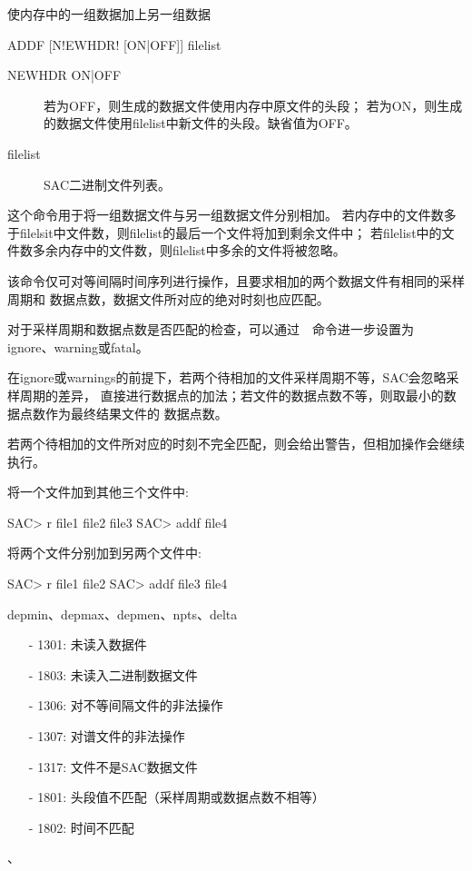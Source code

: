 \label{cmd:addf}

使内存中的一组数据加上另一组数据

\begin{SACSTX}
ADDF [N!EWHDR! [ON|OFF]] filelist
\end{SACSTX}

\begin{description}
\item [NEWHDR ON|OFF] 若为OFF，则生成的数据文件使用内存中原文件的头段；
    若为ON，则生成的数据文件使用filelist中新文件的头段。缺省值为OFF。
\item [filelist] SAC二进制文件列表。
\end{description}

这个命令用于将一组数据文件与另一组数据文件分别相加。
若内存中的文件数多于filelsit中文件数，则filelist的最后一个文件将加到剩余文件中；
若filelist中的文件数多余内存中的文件数，则filelist中多余的文件将被忽略。

该命令仅可对等间隔时间序列进行操作，且要求相加的两个数据文件有相同的采样周期和
数据点数，数据文件所对应的绝对时刻也应匹配。

对于采样周期和数据点数是否匹配的检查，可以通过~~命令进一步设置为
ignore、warning或fatal。

在ignore或warnings的前提下，若两个待相加的文件采样周期不等，SAC会忽略采样周期的差异，
直接进行数据点的加法；若文件的数据点数不等，则取最小的数据点数作为最终结果文件的
数据点数。

若两个待相加的文件所对应的时刻不完全匹配，则会给出警告，但相加操作会继续执行。

将一个文件加到其他三个文件中:
\begin{SACCode}
SAC> r file1 file2 file3
SAC> addf file4
\end{SACCode}

将两个文件分别加到另两个文件中:
\begin{SACCode}
SAC> r file1 file2
SAC> addf file3 file4
\end{SACCode}

depmin、depmax、depmen、npts、delta

\begin{itemize}
\item[-]1301: 未读入数据件
\item[-]1803: 未读入二进制数据文件
\item[-]1306: 对不等间隔文件的非法操作
\item[-]1307: 对谱文件的非法操作
\item[-]1317: 文件不是SAC数据文件
\item[-]1801: 头段值不匹配（采样周期或数据点数不相等）
\end{itemize}

\begin{itemize}
\item[-]1802: 时间不匹配
\end{itemize}

、
